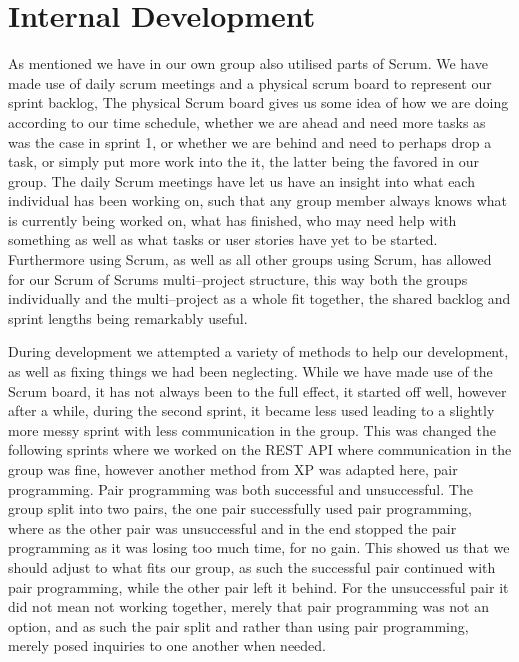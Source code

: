 \section{Internal Development}
As mentioned we have in our own group also utilised parts of Scrum.
We have made use of daily scrum meetings and a physical scrum board to represent our sprint backlog,
The physical Scrum board gives us some idea of how we are doing according to our time schedule, whether we are ahead and need more tasks as was the case in sprint 1, or whether we are behind and need to perhaps drop a task, or simply put more work into the it, the latter being the favored in our group.
The daily Scrum meetings have let us have an insight into what each individual has been working on, such that any group member always knows what is currently being worked on, what has finished, who may need help with something as well as what tasks or user stories have yet to be started.
Furthermore using Scrum, as well as all other groups using Scrum, has allowed for our Scrum of Scrums multi--project structure, this way both the groups individually and the multi--project as a whole fit together, the shared backlog and sprint lengths being remarkably useful.

During development we attempted a variety of methods to help our development, as well as fixing things we had been neglecting.
While we have made use of the Scrum board, it has not always been to the full effect, it started off well, however after a while, during the second sprint, it became less used leading to a slightly more messy sprint with less communication in the group.
This was changed the following sprints where we worked on the REST API where communication in the group was fine, however another method from XP was adapted here, pair programming.
Pair programming was both successful and unsuccessful.
The group split into two pairs, the one pair successfully used pair programming, where as the other pair was unsuccessful and in the end stopped the pair programming as it was losing too much time, for no gain.
This showed us that we should adjust to what fits our group, as such the successful pair continued with pair programming, while the other pair left it behind.
For the unsuccessful pair it did not mean not working together, merely that pair programming was not an option, and as such the pair split and rather than using pair programming, merely posed inquiries to one another when needed.

